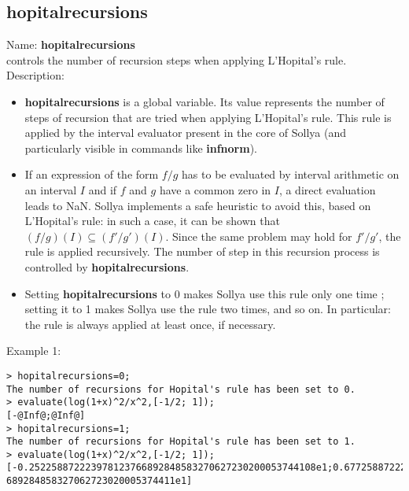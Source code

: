 \subsection{hopitalrecursions}
\label{labhopitalrecursions}
\noindent Name: \textbf{hopitalrecursions}\\
controls the number of recursion steps when applying L'Hopital's rule.\\

\noindent Description: \begin{itemize}

\item \textbf{hopitalrecursions} is a global variable. Its value represents the number of steps of
   recursion that are tried when applying L'Hopital's rule. This rule is applied
   by the interval evaluator present in the core of Sollya (and particularly
   visible in commands like \textbf{infnorm}).

\item If an expression of the form $f/g$ has to be evaluated by interval 
   arithmetic on an interval $I$ and if $f$ and $g$ have a common zero
   in $I$, a direct evaluation leads to NaN.
   Sollya implements a safe heuristic to avoid this, based on L'Hopital's rule: in 
   such a case, it can be shown that $(f/g)(I) \subseteq (f'/g')(I)$. Since
   the same problem may hold for $f'/g'$, the rule is applied recursively.
   The number of step in this recursion process is controlled by \textbf{hopitalrecursions}.

\item Setting \textbf{hopitalrecursions} to 0 makes Sollya use this rule only one time ;
   setting it to 1 makes Sollya use the rule two times, and so on.
   In particular: the rule is always applied at least once, if necessary.
\end{itemize}
\noindent Example 1: 
\begin{center}\begin{minipage}{15cm}\begin{Verbatim}[frame=single]
> hopitalrecursions=0;
The number of recursions for Hopital's rule has been set to 0.
> evaluate(log(1+x)^2/x^2,[-1/2; 1]);
[-@Inf@;@Inf@]
> hopitalrecursions=1;
The number of recursions for Hopital's rule has been set to 1.
> evaluate(log(1+x)^2/x^2,[-1/2; 1]);
[-0.252258872223978123766892848583270627230200053744108e1;0.67725887222397812376
689284858327062723020005374411e1]
\end{Verbatim}
\end{minipage}\end{center}
